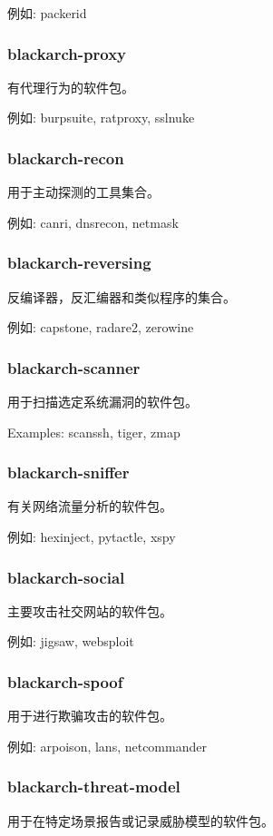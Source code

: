 \documentclass[a4paper, oneside, 11pt]{book}
\begin{document}
例如: packerid

\subsubsection{blackarch-proxy}
有代理行为的软件包。

例如: burpsuite, ratproxy, sslnuke

\subsubsection{blackarch-recon}
用于主动探测的工具集合。

例如: canri, dnsrecon, netmask

\subsubsection{blackarch-reversing}
反编译器，反汇编器和类似程序的集合。

例如: capstone, radare2, zerowine

\subsubsection{blackarch-scanner}
用于扫描选定系统漏洞的软件包。

Examples: scanssh, tiger, zmap

\subsubsection{blackarch-sniffer}
有关网络流量分析的软件包。

例如: hexinject, pytactle, xspy

\subsubsection{blackarch-social}
主要攻击社交网站的软件包。

例如: jigsaw, websploit

\subsubsection{blackarch-spoof}
用于进行欺骗攻击的软件包。

例如: arpoison, lans, netcommander

\subsubsection{blackarch-threat-model}
用于在特定场景报告或记录威胁模型的软件包。
\end{document}
